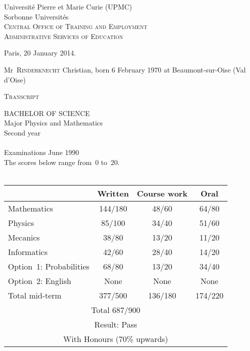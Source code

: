 \documentclass[a4paper,11pt,twoside]{article}
\begin{document}
\thispagestyle{empty}

\begin{center}
Universit\'e Pierre et Marie Curie (UPMC)\\
Sorbonne Universit\'es\\
\textsc{Central Office of Training and Employment}\\
\textsc{Administrative Services of Education}
\end{center}

\bigskip\bigskip\bigskip

\hfill Paris, 20 January 2014.

\bigskip

\begin{center}
Mr~\textsc{Rinderknecht} Christian, born 6 February 1970 at
Beaumont-sur-Oise (Val d'Oise)

\bigskip

\textsc{\Large Transcript}

\bigskip

\textsc{\Large BACHELOR OF SCIENCE}\\
Major Physics and Mathematics\\
Second year\\
\ \\
Examinations June 1990\\
\lbrack The scores below range from~0 to~20.\rbrack\\
\ \\
\begin{tabular}{@{}|l|c|c|c|@{}}
\hline
   & Written & Course work & Oral\\
\hline
Mathematics & 144/180 & 48/60 & 64/80\\
\hline
Physics & 85/100 & 34/40 & 51/60\\
\hline
Mecanics & 38/80 & 13/20 & 11/20\\
\hline
Informatics & 42/60 & 28/40 & 14/20\\
\hline
Option~1: Probabilities & 68/80 & 13/20 & 34/40\\
\hline
Option~2: English & None & None & None\\
\hline
Total mid-term & 377/500 & 136/180 & 174/220\\
\hline
\multicolumn{4}{|c|}{Total 687/900}\\
\hline
\multicolumn{4}{|c|}{Result: Pass}\\
\multicolumn{4}{|c|}{With Honours (70\% upwards)}\\
\hline
\end{tabular}
\end{center}
\end{document}
